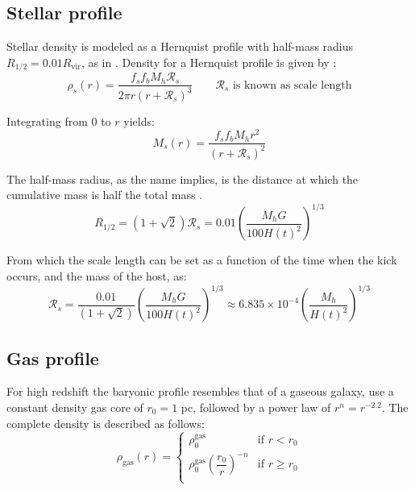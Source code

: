 		\subsection{Stellar profile}
			Stellar density is modeled as a Hernquist profile with half-mass radius $R_{1/2} = 0.01 R_\text{vir}$, as in \citeauthor{choksi2017recoiling}. Density for a Hernquist profile is given by \cite{hernquist1990analytical}:
			\begin{equation}
				\rho_s(r) = \dfrac{f_sf_bM_h \mathcal{R}_s}{2\pi r(r + \mathcal{R}_s)^3} \qquad \text{$\mathcal{R}_s$ is known as scale length}
			\end{equation}
			
			Integrating from $0$ to $r$ yields:
			\begin{equation}
				M_s(r) = \dfrac{f_sf_bM_h r^2}{(r + \mathcal{R}_s)^2}
			\end{equation}
			
			The half-mass radius, as the name implies, is the distance at which the cumulative mass is half the total mass \cite{hernquist1990analytical}.
			\begin{equation}
				R_{1/2} = \left(1 + \sqrt{2}\right)\mathcal{R}_s = 0.01\left({\dfrac{M_hG}{100 H(t)^2}}\right)^{1/3}
			\end{equation}
			
			From which the scale length can be set as a function of the time when the kick occurs, and the mass of the host, as:
			\begin{equation}
				\mathcal{R}_s = \dfrac{0.01}{\left(1 + \sqrt{2}\right)}\left({\dfrac{M_hG}{100 H(t)^2}}\right)^{1/3} \approx 6.835\times 10^{-4}\left({\dfrac{M_h}{H(t)^2}}\right)^{1/3}
			\end{equation}
	
		\subsection{Gas profile}
			For high redshift the baryonic profile resembles that of a gaseous galaxy, \citeauthor{choksi2017recoiling} use a constant density gas core of $r_0 = 1$ pc, followed by a power law of $r^n = r^{-2.2}$. The complete density is described as follows:
			\begin{equation}
				\rho_\text{gas}(r) = \left \{
					\begin{matrix}
					\rho_0^\text{gas} & \text{if $r < r_0$}\\
					\rho_0^\text{gas}\left(\dfrac{r_0}{r}\right)^{-n} & \text{if $r \geq r_0$}\\
					\end{matrix}
				\right.
			\end{equation}
			

